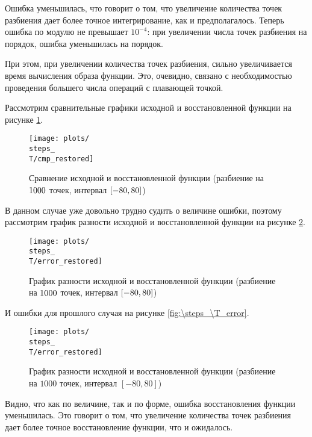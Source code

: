 Ошибка уменьшилась, что говорит о том, что увеличение количества точек разбиения дает более точное интегрирование, как и предполагалось.
Теперь ошибка по модулю не превышает $10^{-4}$: при увеличении числа точек разбиения на порядок, ошибка уменьшилась на порядок.

При этом, при увеличении количества точек разбиения, сильно увеличивается время вычисления образа функции. Это, очевидно, 
связано с необходимостью проведения большего числа операций с плавающей точкой. 

Рассмотрим сравнительные графики исходной и восстановленной функции на рисунке \ref{fig:\steps_\T_cmp_restored}.
\begin{figure}[ht!]
    \centering
    \texttt{[image: plots/\\steps\_\\T/cmp\_restored]}
    \caption{Сравнение исходной и восстановленной функции (разбиение на $\steps$ точек, интервал $[-\T, \T]$)}
    \label{fig:\steps_\T_cmp_restored}
\end{figure}

В данном случае уже довольно трудно судить о величине ошибки, поэтому рассмотрим график разности исходной и восстановленной функции на рисунке \ref{fig:\steps_\T_func_error}. 
\begin{figure}[ht!]
    \centering
    \texttt{[image: plots/\\steps\_\\T/error\_restored]}
    \caption{График разности исходной и восстановленной функции (разбиение на $\steps$ точек, интервал $[-\T, \T]$)}
    \label{fig:\steps_\T_func_error}
\end{figure}

И ошибки для прошлого случая на рисунке \ref{fig:\steps_\T_error}.
\def\steps{1000}
\def\T{80}
\begin{figure}[ht!]
    \centering
    \texttt{[image: plots/\\steps\_\\T/error\_restored]}
    \caption{График разности исходной и восстановленной функции (разбиение на $\steps$ точек, интервал $[-\T, \T]$)}
    \label{fig:\steps_\T_func_error}
\end{figure}

Видно, что как по величине, так и по форме, ошибка восстановления функции уменьшилась. Это говорит о том, что увеличение количества точек разбиения
дает более точное восстановление функции, что и ожидалось. 